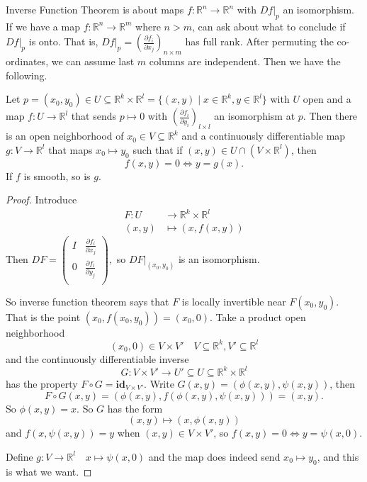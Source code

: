 Inverse Function Theorem is about maps \(f: \mathbb{R}^n \to \mathbb{R}^n\) with \(\left.Df\right|_p\) an isomorphism. If we have a map \(f: \mathbb{R}^n \to \mathbb{R}^m\) where \(n > m\), can ask about what to conclude if \(\left. Df\right|_p\) is onto. That is, \(\left. Df\right|_p = (\frac{\partial f_i}{\partial x_j})_{n\times m}\) has full rank. After permuting the co-ordinates, we can assume last \(m\) columns are independent. Then we have the following.
\begin{theorem}
    Let \(p = (x_0, y_0) \in U \subseteq \mathbb{R}^k \times \mathbb{R}^l = \{(x,y)\mid x\in \mathbb{R}^k, y\in \mathbb{R}^l\}\) with \(U\) open and a map \(f: U \to \mathbb{R}^l\) that sends \(p \mapsto 0\) with \((\frac{\partial f_i}{\partial y_i})_{l\times l}\) an isomorphism at \(p\). Then there is an open neighborhood of \(x_0 \in V \subseteq \mathbb{R}^k\) and a continuously differentiable map \(g: V \to \mathbb{R}^l\) that maps \(x_0 \mapsto y_0\) such that if \((x,y)\in U \cap (V\times \mathbb{R}^l)\), then
    \[
        f(x,y) = 0 \iff y = g(x).
    \]
    If \(f\) is smooth, so is \(g\).
\end{theorem}
\begin{proof}
    Introduce
    \begin{equation*}
    \begin{aligned}
      F\colon U & \longrightarrow \mathbb{R}^k \times \mathbb{R}^l\\
               (x,y) & \longmapsto (x, f(x,y))
    \end{aligned}
    \end{equation*}
    Then \(DF = \begin{pmatrix}
        I & \frac{\partial f_i}{\partial x_j}\\
        0 & \frac{\partial f_i}{\partial y_j}\\\end{pmatrix},\) so \(\left.DF\right|_{(x_0,y_0)}\) is an isomorphism.

        So inverse function theorem says that \(F\) is locally invertible near \(F(x_0, y_0)\). That is the point \((x_0, f(x_0, y_0)) = (x_0,0)\). Take a product open neighborhood
        \[
            (x_0, 0) \in V \times V' \quad V\subseteq \mathbb{R}^k, V' \subseteq \mathbb{R}^l
        \]
        and the continuously differentiable inverse
        \[
            G: V \times V' \to U' \subseteq U \subseteq \mathbb{R}^k \times \mathbb{R}^l
        \]
        has the property \(F \circ G = \textbf{id}_{V\times V'}\). Write \(G(x,y) = (\phi(x,y), \psi(x,y))\), then
        \[
            F\circ G(x, y) = (\phi(x,y), f(\phi(x,y), \psi(x,y))) = (x,y).
        \]
        So \(\phi(x,y) = x\). So \(G\) has the form
        \[
            (x,y)\mapsto (x, \phi(x,y))
        \]
        and \(f(x, \psi(x, y)) = y\) when \((x,y) \in V \times V'\), so \(f(x,y) = 0 \iff y = \psi(x,0)\).
        
        Define \(g: V \to \mathbb{R}^l\quad x \mapsto \psi(x, 0)\) and the map does indeed send \(x_0 \mapsto y_0\), and this is what we want.
\end{proof}

